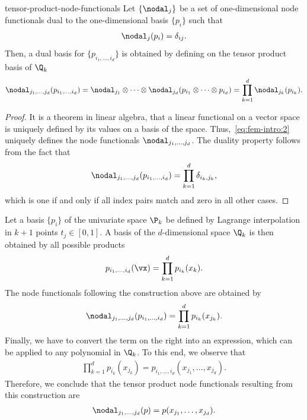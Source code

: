 \begin{Lemma}{tensor-product-node-functionals}
  Let $\{\nodal_j\}$ be a set of one-dimensional node functionals dual
  to the one-dimensional basis $\{p_i\}$ such that
  \begin{gather}
    \nodal_j(p_i) = \delta_{ij}.
  \end{gather}
  Then, a dual basis for $\{p_{i_1,\dots,i_d}\}$ is obtained by
  defining on the tensor product basis of $\Q_k$
  \begin{gather}
    \label{eq:fem-intro:2}
    \nodal_{j_1,\dots,j_d}(p_{i_1,\dots,i_d})
    = \nodal_{j_1} \otimes \dots\otimes \nodal_{j_d}(p_{i_1}\otimes\dots\otimes p_{i_d})
    = \prod_{k=1}^d \nodal_{j_k}(p_{i_k}).
  \end{gather}
\end{Lemma}

\begin{proof}
  It is a theorem in linear algebra, that a linear functional on a
  vector space is uniquely defined by its values on a basis of the
  space. Thus,~\eqref{eq:fem-intro:2} uniquely defines the node
  functionals $\nodal_{j_1,\dots,j_d}$. The duality property follows
  from the fact that
  \begin{gather*}
    \nodal_{j_1,\dots,j_d}(p_{i_1,\dots,i_d}) = \prod_{k=1}^d \delta_{i_k,j_k},
  \end{gather*}
  which is one if and only if all index pairs match and zero in all
  other cases.
\end{proof}

\begin{example}
  Let a basis $\{p_i\}$ of the univariate space $\P_k$ be defined by
  Lagrange interpolation in $k+1$ points $t_j \in [0,1]$. A basis of
  the $d$-dimensional space $\Q_k$ is then obtained by all possible
  products
  \begin{gather*}
    p_{i_1,\dots,i_d}(\vx) = \prod_{k=1}^d p_{i_k}(x_k).
  \end{gather*}
  The node functionals following the construction above are obtained by
  \begin{gather*}
    \nodal_{j_1,\dots,j_d}(p_{i_1,\dots,i_d}) = \prod_{k=1}^d p_{i_k}(x_{j_k}).
  \end{gather*}
  Finally, we have to convert the term on the right into an
  expression, which can be applied to any polynomial in $\Q_k$. To
  this end, we observe that
  \begin{gather*}
    \prod_{k=1}^d p_{i_k}(x_{j_k}) = p_{i_1,\dots,i_d}(x_{j_1},\dots,x_{j_d}).
  \end{gather*}
  Therefore, we conclude that the tensor product node functionals
  resulting from this construction are
  \begin{gather*}
    \nodal_{j_1,\dots,j_d}(p) = p(x_{j_1},\dots,x_{j_d}).
  \end{gather*}
\end{example}

